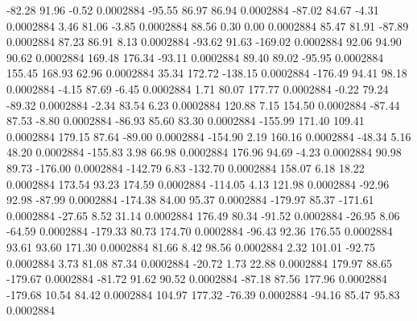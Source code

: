       -82.28       91.96       -0.52     0.0002884
      -95.55       86.97       86.94     0.0002884
      -87.02       84.67       -4.31     0.0002884
        3.46       81.06       -3.85     0.0002884
       88.56        0.30        0.00     0.0002884
       85.47       81.91      -87.89     0.0002884
       87.23       86.91        8.13     0.0002884
      -93.62       91.63     -169.02     0.0002884
       92.06       94.90       90.62     0.0002884
      169.48      176.34      -93.11     0.0002884
       89.40       89.02      -95.95     0.0002884
      155.45      168.93       62.96     0.0002884
       35.34      172.72     -138.15     0.0002884
     -176.49       94.41       98.18     0.0002884
       -4.15       87.69       -6.45     0.0002884
        1.71       80.07      177.77     0.0002884
       -0.22       79.24      -89.32     0.0002884
       -2.34       83.54        6.23     0.0002884
      120.88        7.15      154.50     0.0002884
      -87.44       87.53       -8.80     0.0002884
      -86.93       85.60       83.30     0.0002884
     -155.99      171.40      109.41     0.0002884
      179.15       87.64      -89.00     0.0002884
     -154.90        2.19      160.16     0.0002884
      -48.34        5.16       48.20     0.0002884
     -155.83        3.98       66.98     0.0002884
      176.96       94.69       -4.23     0.0002884
       90.98       89.73     -176.00     0.0002884
     -142.79        6.83     -132.70     0.0002884
      158.07        6.18       18.22     0.0002884
      173.54       93.23      174.59     0.0002884
     -114.05        4.13      121.98     0.0002884
      -92.96       92.98      -87.99     0.0002884
     -174.38       84.00       95.37     0.0002884
     -179.97       85.37     -171.61     0.0002884
      -27.65        8.52       31.14     0.0002884
      176.49       80.34      -91.52     0.0002884
      -26.95        8.06      -64.59     0.0002884
     -179.33       80.73      174.70     0.0002884
      -96.43       92.36      176.55     0.0002884
       93.61       93.60      171.30     0.0002884
       81.66        8.42       98.56     0.0002884
        2.32      101.01      -92.75     0.0002884
        3.73       81.08       87.34     0.0002884
      -20.72        1.73       22.88     0.0002884
      179.97       88.65     -179.67     0.0002884
      -81.72       91.62       90.52     0.0002884
      -87.18       87.56      177.96     0.0002884
     -179.68       10.54       84.42     0.0002884
      104.97      177.32      -76.39     0.0002884
      -94.16       85.47       95.83     0.0002884
